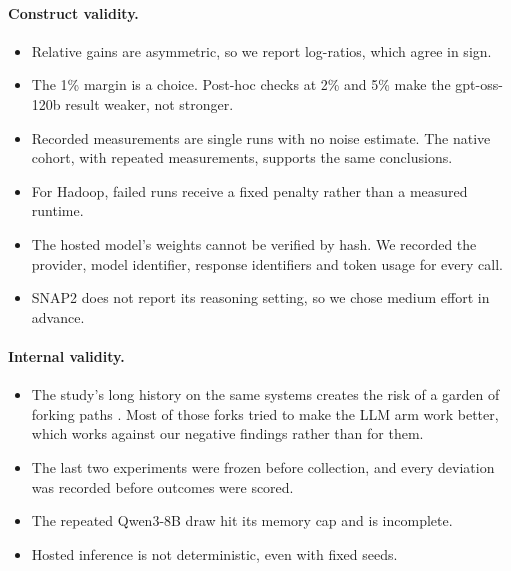 \paragraph{Construct validity.}
\begin{itemize}
  \item Relative gains are asymmetric, so we report log-ratios, which agree in sign.
  \item The 1\% margin is a choice. Post-hoc checks at 2\% and 5\% make the gpt-oss-120b result weaker, not stronger.
  \item Recorded measurements are single runs with no noise estimate. The native cohort, with repeated measurements, supports the same conclusions.
  \item For Hadoop, failed runs receive a fixed penalty rather than a measured runtime.
  \item The hosted model's weights cannot be verified by hash. We recorded the provider, model identifier, response identifiers and token usage for every call.
  \item SNAP2 does not report its reasoning setting, so we chose medium effort in advance.
\end{itemize}

\paragraph{Internal validity.}
\begin{itemize}
  \item The study's long history on the same systems creates the risk of a garden of forking paths \cite{gelman2014forking}. Most of those forks tried to make the LLM arm work better, which works against our negative findings rather than for them.
  \item The last two experiments were frozen before collection, and every deviation was recorded before outcomes were scored.
  \item The repeated Qwen3-8B draw hit its memory cap and is incomplete.
  \item Hosted inference is not deterministic, even with fixed seeds.
\end{itemize}

